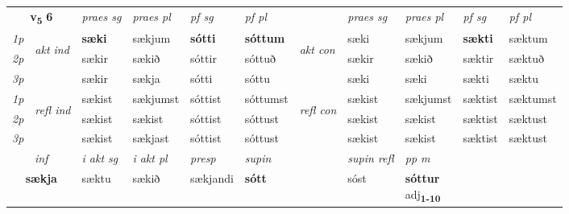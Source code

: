 \noindent
\noindent
\begin{tabular}{lllllllllll} \toprule
\multicolumn{2}{c}{\textbf{v{\textsubscript{5}}} \Large{\textbf{6}}}  &  \textit{praes sg}  & \textit{praes pl}  &\textit{ pf sg} & \textit{pf pl} &  &  \textit{praes sg}  & \textit{praes pl}  & \textit{pf sg} & \textit{pf pl } \\*
	\cmidrule{3-6} \cmidrule{8-11}
 {\textit{1p}} & \multirow{3}{*}{\begin{turn}{90}\textit{akt ind}\end{turn}} & \textbf{sæki} & sækjum & \textbf{sótti} & \textbf{sóttum} & \multirow{3}{*}{\begin{turn}{90}\textit{akt con}\end{turn}} &sæki & sækjum & \textbf{sækti} & sæktum\\*
 {\textit{2p}} &  &  sækir  & sækið & sóttir & sóttuð & & sækir & sækið & sæktir & sæktuð \\*
{\textit{3p}} &  & sækir & sækja & sótti & sóttu & & sæki & sæki& sækti & sæktu \\*
\cmidrule{3-6} \cmidrule{8-11}
 {\textit{1p}} & \multirow{3}{*}{\begin{turn}{90}\textit{refl ind}\end{turn}}  & sækist & sækjumst & sóttist & sóttumst & \multirow{3}{*}{\begin{turn}{90}\textit{refl con}\end{turn}}  &sækist & sækjumst & sæktist & sæktumst \\*
 {\textit{2p}} &  & sækist & sækist & sóttist & sóttust & &sækist & sækist & sæktist & sæktust \\*
 {\textit{3p}}  & & sækist & sækjast & sóttist & sóttust & & sækist & sækist& sæktist & sæktust \\*
\cmidrule{3-6} \cmidrule{8-11}

   \multicolumn{2}{c}{\textit{inf}}  & \textit{i akt sg} & \textit{i akt pl}   & \textit{presp} & \textit{supin} && \textit{supin refl} & \textit{pp m} \\*
  \multicolumn{2}{c}{\textbf{sækja}} & sæktu  & sækið   & sækjandi &  \textbf{sótt} && sóst & \specialcell{\textbf{sóttur} \\ adj\textbf{\textsubscript{1-10}}} \\*
\end{tabular}

